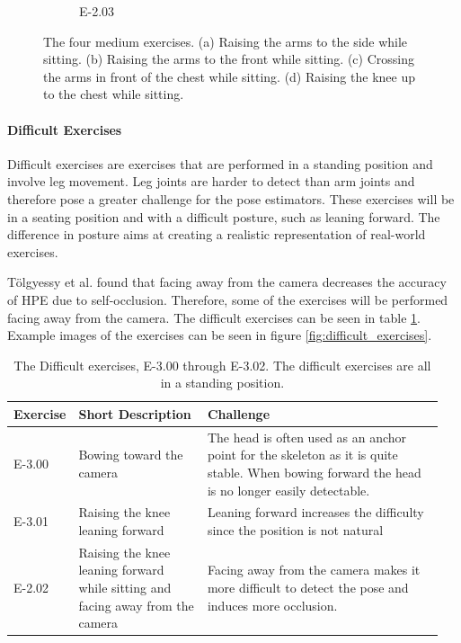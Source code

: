\begin{figure}[ht]
\begin{subfigure}[b]{0.16\linewidth}
        \caption[]{E-2.03}
    \end{subfigure}
    \caption[Easy Exercises]{The four medium exercises. (a) Raising the arms to the side while sitting. (b) Raising the arms to the front while sitting. (c) Crossing the arms in front of the chest while sitting. (d) Raising the knee up to the chest while sitting.}
    \label{fig:medium_exercises}
  \end{figure}  

\paragraph{Difficult Exercises}

Difficult exercises are exercises that are performed in a standing position and involve leg movement. Leg joints are harder to detect than arm joints and therefore pose a greater challenge for the pose estimators. These exercises will be in a seating position and with a difficult posture, such as leaning forward. The difference in posture aims at creating a realistic representation of real-world exercises.

Tölgyessy et al. found that facing away from the camera decreases the accuracy of HPE due to self-occlusion. \cite{HPEIsHard} Therefore, some of the exercises will be performed facing away from the camera. The difficult exercises can be seen in table \ref{tab:difficult_exercises}. Example images of the exercises can be seen in figure \ref{fig:difficult_exercises}.

\begin{table}[ht]
  \caption[Difficult Exercises]{The Difficult exercises, E-3.00 through E-3.02. The difficult exercises are all in a standing position.}
  \label{tab:difficult_exercises}
  \begin{tabular}{p{0.1\linewidth}p{0.3\linewidth}p{0.55\linewidth}}
  \hline
  Exercise & Short Description                                                              & Challenge \\ \hline
  E-3.00   & Bowing toward the camera                                                       & The head is often used as an anchor point for the skeleton as it is quite stable. When bowing forward the head is no longer easily detectable. \\
  E-3.01   & Raising the knee leaning forward                                               & Leaning forward increases the difficulty since the position is not natural \\
  E-2.02   & Raising the knee leaning forward while sitting and facing away from the camera & Facing away from the camera makes it more difficult to detect the pose and induces more occlusion.  \\ \hline
  \end{tabular}
\end{table}



